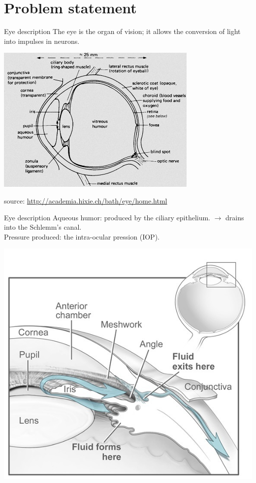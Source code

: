 \section{Problem statement}
\frame{\sectionpage}
\begin{frame}{Eye description}
The eye is the organ of vision; it allows the conversion of light into impulses in neurons.
\begin{center}
\includegraphics[width=.7\linewidth]{Eye.jpg}
\end{center}
\tiny{source: \url{http://academia.hixie.ch/bath/eye/home.html}}
\end{frame}

\begin{frame}{Eye description}
Aqueous humor: produced by the ciliary epithelium.
$\rightarrow$ drains into the Schlemm's canal.\\
Pressure produced: the intra-ocular pression (IOP).
\begin{center}
\includegraphics[width=.5\linewidth]{Humor.jpg}
\end{center}


\end{frame}

